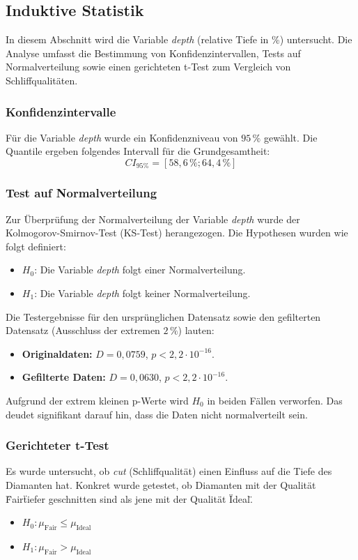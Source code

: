 \subsection{Induktive Statistik}
In diesem Abschnitt wird die Variable \textit{depth} (relative Tiefe in \%) untersucht. 
Die Analyse umfasst die Bestimmung von Konfidenzintervallen, Tests auf Normalverteilung sowie einen gerichteten t-Test zum Vergleich von Schliffqualitäten.

\subsubsection{Konfidenzintervalle}
Für die Variable \textit{depth} wurde ein Konfidenzniveau von $95\,\%$ gewählt. 
Die Quantile ergeben folgendes Intervall für die Grundgesamtheit:
\begin{equation}
    CI_{95\%} = [58,6\,\%; 64,4\,\%] \text{}
\end{equation}

\subsubsection{Test auf Normalverteilung}
Zur Überprüfung der Normalverteilung der Variable \textit{depth} wurde der Kolmogorov-Smirnov-Test (KS-Test) herangezogen.
Die Hypothesen wurden wie folgt definiert:
\begin{itemize}
    \item $H_0$: Die Variable \textit{depth} folgt einer Normalverteilung.
    \item $H_1$: Die Variable \textit{depth} folgt keiner Normalverteilung.
\end{itemize}

Die Testergebnisse für den ursprünglichen Datensatz sowie den gefilterten Datensatz (Ausschluss der extremen $2\,\%$) lauten:
\begin{itemize}
    \item \textbf{Originaldaten:} $D = 0,0759$, $p < 2,2 \cdot 10^{-16}$.
    \item \textbf{Gefilterte Daten:} $D = 0,0630$, $p < 2,2 \cdot 10^{-16}$.
\end{itemize}
Aufgrund der extrem kleinen p-Werte wird $H_0$ in beiden Fällen verworfen. 
Das deudet signifikant darauf hin, dass die Daten nicht normalverteilt sein.

\subsubsection{Gerichteter t-Test}
Es wurde untersucht, ob \textit{cut} (Schliffqualität) einen Einfluss auf die Tiefe des Diamanten hat. Konkret wurde getestet, ob Diamanten mit der Qualität \"Fair\" tiefer geschnitten sind als jene mit der Qualität \"Ideal\".
\begin{itemize}
    \item $H_0: \mu_{\text{Fair}} \le \mu_{\text{Ideal}}$
    \item $H_1: \mu_{\text{Fair}} > \mu_{\text{Ideal}}$
\end{itemize}


